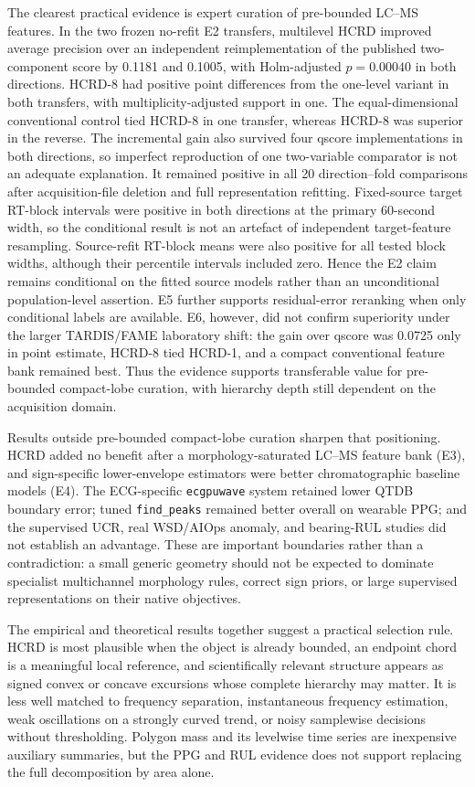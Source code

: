 \documentclass[review,onefignum,onetabnum]{siamonline250211}
\begin{document}
The clearest practical evidence is expert curation of pre-bounded LC--MS
features.  In the two frozen no-refit E2 transfers, multilevel HCRD improved
average precision over an independent reimplementation of the published
two-component score by 0.1181 and 0.1005, with
Holm-adjusted $p=0.00040$ in both directions.  HCRD-8 had positive point
differences from the one-level variant in both transfers, with
multiplicity-adjusted support in one.  The equal-dimensional conventional
control tied HCRD-8 in one transfer, whereas HCRD-8 was superior in the
reverse.  The incremental gain also survived four qscore implementations in
both directions, so imperfect reproduction of one two-variable comparator is
not an adequate explanation.  It remained positive in all 20 direction--fold
comparisons after acquisition-file deletion and full representation refitting.
Fixed-source target RT-block intervals were positive in both directions at the
primary 60-second width, so the conditional result is not an artefact of
independent target-feature resampling.  Source-refit RT-block means were also
positive for all tested block widths, although their percentile intervals
included zero.  Hence the E2 claim remains conditional on the fitted source
models rather than an unconditional population-level assertion.
E5 further supports residual-error reranking when only conditional
labels are available.  E6, however, did not confirm superiority under the
larger TARDIS/FAME laboratory shift: the gain over qscore was 0.0725 only in
point estimate, HCRD-8 tied HCRD-1, and a compact conventional feature bank
remained best.  Thus the evidence supports transferable value for
pre-bounded compact-lobe curation, with hierarchy depth still dependent on the
acquisition domain.

Results outside pre-bounded compact-lobe curation sharpen that positioning.
HCRD added no benefit after a morphology-saturated LC--MS feature bank (E3), and
sign-specific lower-envelope estimators were better chromatographic baseline
models (E4).  The ECG-specific \texttt{ecgpuwave} system retained lower QTDB
boundary error; tuned \texttt{find\_peaks} remained better overall on wearable
PPG; and the supervised UCR, real WSD/AIOps anomaly, and bearing-RUL studies did
not establish an advantage.  These are important boundaries rather than a
contradiction: a small generic geometry should not be expected to dominate
specialist multichannel morphology rules, correct sign priors, or large
supervised representations on their native objectives.

The empirical and theoretical results together suggest a practical selection
rule.  HCRD is most plausible when the object is already bounded, an endpoint
chord is a meaningful local reference, and scientifically relevant structure
appears as signed convex or concave excursions whose complete hierarchy may
matter.  It is less well matched to frequency separation, instantaneous
frequency estimation, weak oscillations on a strongly curved trend, or noisy
samplewise decisions without thresholding.  Polygon mass and its levelwise
time series are inexpensive auxiliary summaries, but the PPG and RUL evidence
does not support replacing the full decomposition by area alone.
\end{document}

